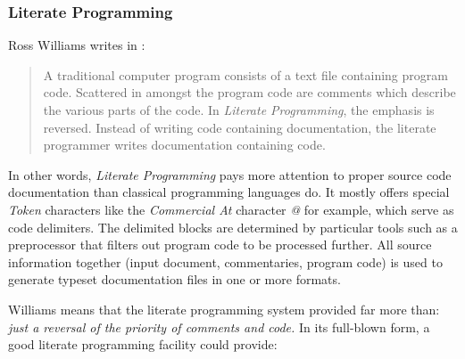 %
%
%
%
%
%
%

\subsubsection{Literate Programming}
\label{literate_programming_heading}

Ross Williams writes in \cite[section 1.1]{williams}:

\begin{quote}
    A traditional computer program consists of a text file containing program
    code. Scattered in amongst the program code are comments which describe the
    various parts of the code. In \emph{Literate Programming}, the emphasis is
    reversed. Instead of writing code containing documentation, the literate
    programmer writes documentation containing code.
\end{quote}

In other words, \emph{Literate Programming} pays more attention to proper source
code documentation than classical programming languages do. It mostly offers
special \emph{Token} characters like the \emph{Commercial At} character \emph{@}
for example, which serve as code delimiters. The delimited blocks are determined
by particular tools such as a preprocessor that filters out program code to be
processed further. All source information together (input document, commentaries,
program code) is used to generate typeset documentation files in one or more
formats.

Williams \cite{williams} means that the literate programming system provided
far more than: \textit{just a reversal of the priority of comments and code.}
In its full-blown form, a good literate programming facility could provide:

